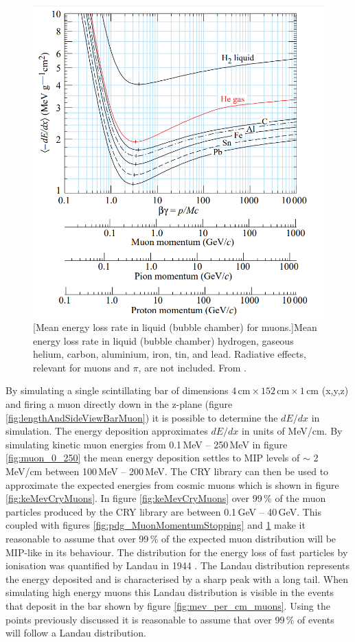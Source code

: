 \begin{figure}[!h]
 \centering
 \includegraphics[width=0.7\linewidth]{Chapter4/Figs/Raster/pdg_dedx_gcm2.png}
 [Mean energy loss rate in liquid (bubble chamber) for muons.]{Mean energy loss rate in liquid (bubble chamber) hydrogen, gaseous helium, carbon, aluminium, iron, tin, and lead. Radiative effects, relevant for
muons and $\pi$, are not included. From \cite{Olive_2014}.} 
 \label{fig:pdg_dedx_gcm2}
\end{figure}

By simulating a single scintillating bar of dimensions $4\,\textrm{cm} \times 152\,\textrm{cm} \times 1\,\textrm{cm}$ (x,y,z) and firing a muon directly down in the z-plane (figure \ref{fig:lengthAndSideViewBarMuon}) it is possible to determine the $dE/dx$ in simulation. The energy deposition approximates $dE/dx$ in units of MeV/cm. By simulating kinetic muon energies from 0.1\,MeV -- 250\,MeV in figure \ref{fig:muon_0_250} the mean energy deposition settles to MIP levels of $\sim$ 2 MeV/cm between 100\,MeV -- 200\,MeV. The CRY library \cite{ieee_cry_2007} can then be used to approximate the expected energies from cosmic muons which is shown in figure \ref{fig:keMevCryMuons}. In figure \ref{fig:keMevCryMuons} over 99\,\% of the muon particles produced by the CRY library are between 0.1\,GeV -- 40\,GeV. This coupled with figures \ref{fig:pdg_MuonMomentumStopping} and \ref{fig:pdg_dedx_gcm2} make it reasonable to assume that over 99\,\% of the expected muon distribution will be MIP-like in its behaviour. The distribution for the energy loss of fast particles by ionisation was quantified by Landau in 1944 \cite{landau1944energy}. The Landau distribution represents the energy deposited and is characterised by a sharp peak with a long tail. When simulating high energy muons this Landau distribution is visible in the events that deposit in the bar shown by figure \ref{fig:mev_per_cm_muons}. Using the points previously discussed it is reasonable to assume that over 99\,\% of events will follow a Landau distribution. %

